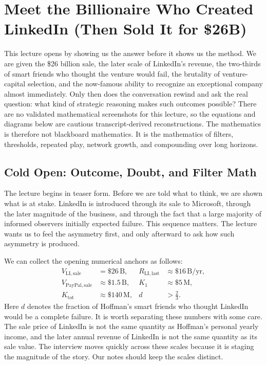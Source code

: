 \chapter{Meet the Billionaire Who Created LinkedIn (Then Sold It for \$26B)}

This lecture opens by showing us the answer before it shows us the method. We are given the \$26 billion sale, the later scale of LinkedIn's revenue, the two-thirds of smart friends who thought the venture would fail, the brutality of venture-capital selection, and the now-famous ability to recognize an exceptional company almost immediately. Only then does the conversation rewind and ask the real question: what kind of strategic reasoning makes such outcomes possible? There are no validated mathematical screenshots for this lecture, so the equations and diagrams below are cautious transcript-derived reconstructions. The mathematics is therefore not blackboard mathematics. It is the mathematics of filters, thresholds, repeated play, network growth, and compounding over long horizons.

\section{Cold Open: Outcome, Doubt, and Filter Math}

The lecture begins in teaser form. Before we are told what to think, we are shown what is at stake. LinkedIn is introduced through its sale to Microsoft, through the later magnitude of the business, and through the fact that a large majority of informed observers initially expected failure. This sequence matters. The lecture wants us to feel the asymmetry first, and only afterward to ask how such asymmetry is produced.

We can collect the opening numerical anchors as follows:
\begin{align}
V_{\mathrm{LI,sale}} &= \$26\,\mathrm{B}, &
R_{\mathrm{LI,last}} &\approx \$16\,\mathrm{B/yr}, \\
V_{\mathrm{PayPal,sale}} &\approx \$1.5\,\mathrm{B}, &
K_1 &\approx \$5\,\mathrm{M}, \\
K_{\mathrm{tot}} &\approx \$140\,\mathrm{M}, &
d &> \frac{2}{3}.
\end{align}
Here \(d\) denotes the fraction of Hoffman's smart friends who thought LinkedIn would be a complete failure. It is worth separating these numbers with some care. The sale price of LinkedIn is not the same quantity as Hoffman's personal yearly income, and the later annual revenue of LinkedIn is not the same quantity as its sale value. The interview moves quickly across these scales because it is staging the magnitude of the story. Our notes should keep the scales distinct.

